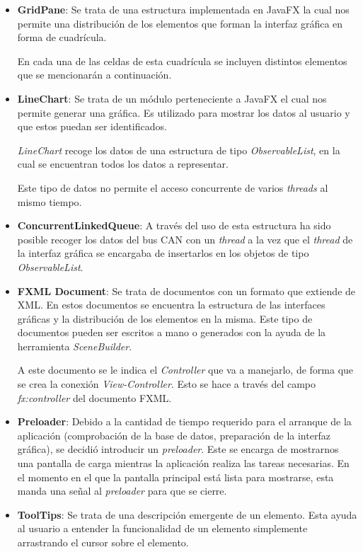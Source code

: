 \begin{itemize}
\item
\textbf{GridPane}: Se trata de una estructura implementada en JavaFX la cual nos permite una distribución de los elementos que forman la interfaz gráfica en forma de cuadrícula.

En cada una de las celdas de esta cuadrícula se incluyen distintos elementos que se mencionarán a continuación.
\item
\textbf{LineChart}: Se trata de un módulo perteneciente a JavaFX el cual nos permite generar una gráfica. Es utilizado para mostrar los datos al usuario y que estos puedan ser identificados.

\emph{LineChart} recoge los datos de una estructura de tipo \emph{ObservableList}, en la cual se encuentran todos los datos a representar.

Este tipo de datos no permite el acceso concurrente de varios \emph{threads} al mismo tiempo.


\item
\textbf{ConcurrentLinkedQueue}: A través del uso de esta estructura ha sido posible recoger los datos del bus CAN con un \emph{thread} a la vez que el \emph{thread} de la interfaz gráfica se encargaba de insertarlos en los objetos de tipo \emph{ObservableList}.
\item
\textbf{FXML Document}: Se trata de documentos con un formato que extiende de XML. En estos documentos se encuentra la estructura de las interfaces gráficas y la distribución de los elementos en la misma. Este tipo de documentos pueden ser escritos a mano o generados con la ayuda de la herramienta \emph{SceneBuilder}.

A este documento se le indica el \emph{Controller} que va a manejarlo, de forma que se crea la conexión \emph{View-Controller}. Esto se hace a través del campo \emph{fx:controller} del documento FXML.
\item
\textbf{Preloader}: Debido a la cantidad de tiempo requerido para el arranque de la aplicación (comprobación de la base de datos, preparación de la interfaz gráfica), se decidió introducir un \emph{preloader}. Este se encarga de mostrarnos una pantalla de carga mientras la aplicación realiza las tareas necesarias. En el momento en el que la pantalla principal está lista para mostrarse, esta manda una señal al \emph{preloader} para que se cierre.

\item
\textbf{ToolTips}: Se trata de una descripción emergente de un elemento. Esta ayuda al usuario a entender la funcionalidad de un elemento simplemente arrastrando el cursor sobre el elemento.


\end{itemize}



